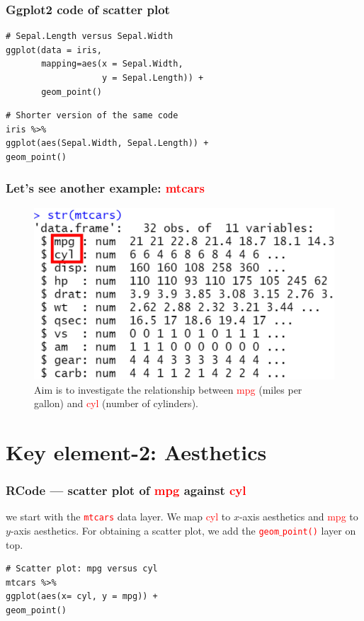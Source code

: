 \documentclass{beamer}
\begin{document}
\begin{frame}[fragile]\frametitle{Ggplot2 code of scatter plot}
\begin{lstlisting}
# Sepal.Length versus Sepal.Width
ggplot(data = iris,
       mapping=aes(x = Sepal.Width, 
                   y = Sepal.Length)) +
       geom_point()
\end{lstlisting}

\begin{lstlisting}
# Shorter version of the same code
iris %>%
ggplot(aes(Sepal.Width, Sepal.Length)) +
geom_point()
\end{lstlisting}
\end{frame}

\begin{frame}\frametitle{Let's see another example: \textcolor{red}{mtcars}}
\begin{figure}
\includegraphics[width=0.99\linewidth]{PlotsLec2/mtcars}
\caption{{\small Aim is to investigate the relationship between \textcolor{red}{mpg} (miles per gallon) and \textcolor{red}{cyl} (number of cylinders).}}
\end{figure}
\end{frame}


\section{Key element-2: Aesthetics}
\begin{frame}[fragile]\frametitle{RCode --- scatter plot of \textcolor{red}{mpg} against \textcolor{red}{cyl}}
we start with the \textcolor{red}{\texttt{mtcars}} data layer. We map \textcolor{red}{cyl} to $x$-axis aesthetics and \textcolor{red}{mpg} to $y$-axis aesthetics. For obtaining a scatter plot, we add the \textcolor{red}{\texttt{geom}$\_$\texttt{point()}} layer on top.
\lstset{basicstyle=\Large\ttfamily}
\begin{lstlisting}
# Scatter plot: mpg versus cyl
mtcars %>%
ggplot(aes(x= cyl, y = mpg)) +
geom_point()
\end{lstlisting}
\end{frame}
\end{document}
